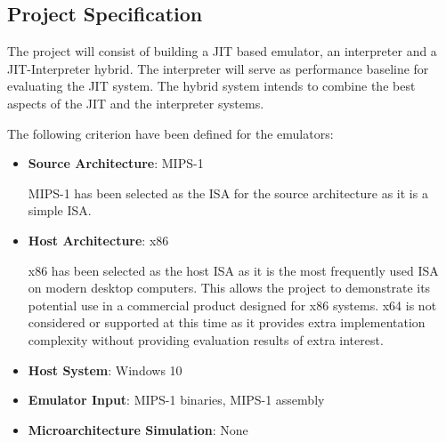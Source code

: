 \subsection{Project Specification}

The project will consist of building a JIT based emulator, an interpreter and a JIT-Interpreter hybrid. The interpreter will serve as performance baseline for evaluating the JIT system. The hybrid system intends to combine the best aspects of the JIT and the interpreter systems.

The following criterion have been defined for the emulators:

\begin{itemize}
    \item \textbf{Source Architecture}: MIPS-1
    
    MIPS-1 has been selected as the ISA for the source architecture as it is a simple ISA. 
    
    \item \textbf{Host Architecture}: x86
    
    x86 has been selected as the host ISA as it is the most frequently used ISA on modern desktop computers. This allows the project to demonstrate its potential use in a commercial product designed for x86 systems. x64 is not considered or supported at this time as it provides extra implementation complexity without providing evaluation results of extra interest.
    
    \item \textbf{Host System}: Windows 10
    \item \textbf{Emulator Input}: MIPS-1 binaries, MIPS-1 assembly
    \item \textbf{Microarchitecture Simulation}: None
\end{itemize}